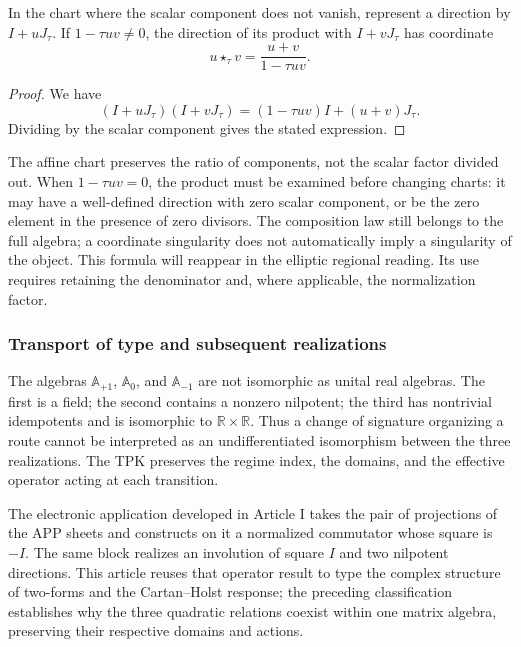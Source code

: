 \begin{proposition}
\label{trit-ampl-prop-pendientes}
In the chart where the scalar component does not vanish, represent a
direction by \(I+uJ_\tau\). If \(1-\tau uv\ne0\), the direction of its
product with \(I+vJ_\tau\) has coordinate
\[
 u\star_\tau v=\frac{u+v}{1-\tau uv}.
\]
\end{proposition}
\begin{proof}
We have
\[
 (I+uJ_\tau)(I+vJ_\tau)
   =(1-\tau uv)I+(u+v)J_\tau.
\]
Dividing by the scalar component gives the stated expression.
\end{proof}

The affine chart preserves the ratio of components, not the scalar factor
divided out. When \(1-\tau uv=0\), the product must be examined before
changing charts: it may have a well-defined direction with zero scalar
component, or be the zero element in the presence of zero divisors.
The composition law still belongs to the full algebra; a coordinate
singularity does not automatically imply a singularity of the object.
This formula will reappear in the elliptic regional reading. Its use
requires retaining the denominator and, where applicable, the normalization factor.

\subsubsection{Transport of type and subsequent realizations}
\label{trit-ampl-puentes}

The algebras \(\mathbb A_{+1}\), \(\mathbb A_0\), and
\(\mathbb A_{-1}\) are not isomorphic as unital real algebras.
The first is a field; the second contains a nonzero nilpotent; the
third has nontrivial idempotents and is isomorphic to
\(\mathbb R\times\mathbb R\). Thus a change of signature organizing a
route cannot be interpreted as an undifferentiated isomorphism between
the three realizations. The TPK preserves the regime index, the domains,
and the effective operator acting at each transition.

The electronic application developed in Article I takes the pair of
projections of the APP sheets and constructs on it a normalized
commutator whose square is \(-I\). The same block realizes an involution
of square \(I\) and two nilpotent directions. This article reuses
that operator result to type the complex structure of two-forms
and the Cartan--Holst response; the preceding classification establishes
why the three quadratic relations coexist within one matrix algebra,
preserving their respective domains and actions.

